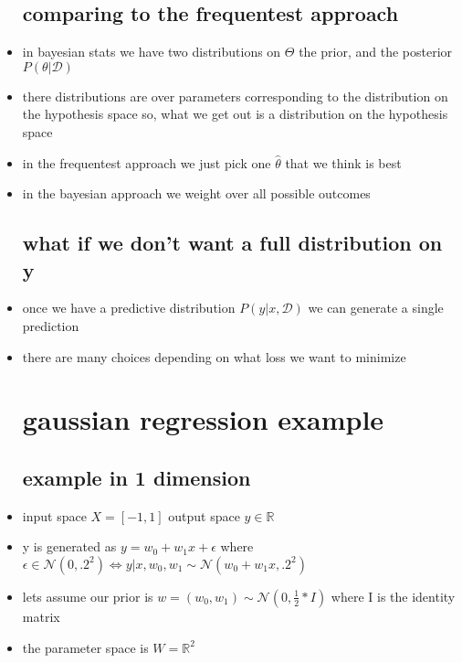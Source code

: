 \documentclass{article}
\begin{document}
\begin{itemize}
\subsection*{comparing to the frequentest approach}
\item in bayesian stats we have two distributions on $\Theta$ the prior, and the posterior $P(\theta|\mathcal{D})$
\item there distributions are over parameters corresponding to the distribution on the hypothesis space so, what we get out is a distribution on the hypothesis space
\item in the frequentest approach we just pick one $\hat{\theta}$ that we think is best 
\item in the bayesian approach we weight over all possible outcomes 
\subsection*{what if we don't want a full distribution on y }
\item once we have a predictive distribution $P(y|x,\mathcal{D})$ we can generate a single prediction
\item there are many choices depending on what loss we want to minimize
\section*{gaussian regression example}
\subsection*{example in 1 dimension}
\item input space $X=[-1,1]$ output space $y\in \mathbb{R}$
\item y is generated as $y=w_0+w_1x+\epsilon$ where $\epsilon\in \mathcal{N}(0,.2^2)\iff y|x,w_0,w_1\sim\mathcal{N}(w_0+w_1x,.2^2)$
\item lets assume our prior is $w=(w_0,w_1)\sim\mathcal{N}(0,\frac{1}{2}*I)$ where I is the identity matrix
\item the parameter space is $W=\mathbb{R}^{2}$

\end{itemize}
\end{document}
